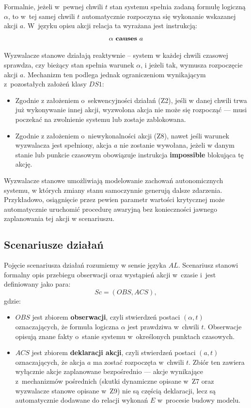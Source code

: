 \documentclass[12pt,a4paper]{article}
\begin{document}
Formalnie, jeżeli w~pewnej chwili $t$ stan systemu spełnia zadaną formułę logiczną $\alpha$, to w~tej samej chwili $t$ automatycznie rozpoczyna się wykonanie wskazanej akcji $a$. W~języku opisu akcji relacja ta wyrażana jest instrukcją:
\[
\alpha \text{ \textbf{causes} } a
\]
 
Wyzwalacze stanowe działają reaktywnie – system w każdej chwili czasowej sprawdza, czy bieżący stan spełnia warunek $\alpha$, i jeżeli tak, wymusza rozpoczęcie akcji $a$. Mechanizm ten podlega jednak ograniczeniom wynikającym z~pozostałych założeń klasy $DS1$:
\begin{itemize}
    \item Zgodnie z założeniem o~sekwencyjności działań (Z2), jeśli w danej chwili trwa już wykonywanie innej akcji, wyzwolona akcja nie może się rozpocząć — musi poczekać na zwolnienie systemu lub zostaje zablokowana.
    \item Zgodnie z założeniem o~niewykonalności akcji (Z8), nawet jeśli warunek wyzwalacza jest spełniony, akcja $a$ nie zostanie wywołana, jeżeli w danym stanie lub punkcie czasowym obowiązuje instrukcja \textbf{impossible} blokująca tę akcję.
\end{itemize}
 
Wyzwalacze stanowe umożliwiają modelowanie zachowań autonomicznych systemu, w których zmiany stanu samoczynnie generują dalsze zdarzenia. Przykładowo, osiągnięcie przez pewien parametr wartości krytycznej może automatycznie uruchomić procedurę awaryjną bez konieczności jawnego zaplanowania tej akcji w scenariuszu.

\subsection{Scenariusze działań}
 
Pojęcie scenariusza działań rozumiemy w sensie języka $AL$. Scenariusz stanowi formalny opis przebiegu obserwacji oraz wystąpień akcji w~czasie i~jest definiowany jako para:
\[
Sc = (OBS, ACS),
\]
gdzie:
\begin{itemize}
    \item $OBS$ jest zbiorem \textbf{obserwacji}, czyli stwierdzeń postaci $(\alpha, t)$ oznaczających, że formuła logiczna $\alpha$ jest prawdziwa w~chwili $t$. Obserwacje opisują znane fakty o~stanie systemu w~określonych punktach czasowych.
    \item $ACS$ jest zbiorem \textbf{deklaracji akcji}, czyli stwierdzeń postaci $(a, t)$ oznaczających, że akcja $a$ ma zostać rozpoczęta w~chwili $t$. Zbiór ten zawiera wyłącznie akcje zaplanowane bezpośrednio --- akcje wynikające z~mechanizmów pośrednich (skutki dynamiczne opisane w~Z7 oraz wyzwalacze stanowe opisane w~Z9) nie są częścią deklaracji, lecz są automatycznie dodawane do relacji wykonań $E$ w~procesie budowy modelu.
\end{itemize}
 
\end{document}
